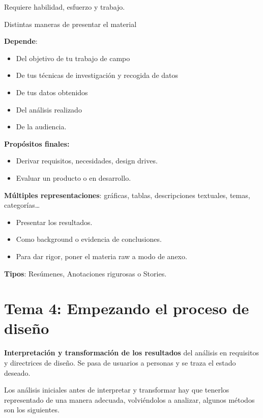 Requiere habilidad, esfuerzo y trabajo.

Distintas maneras de presentar el material

\textbf{Depende}:

\begin{itemize}
\item
  Del objetivo de tu trabajo de campo
\item
  De tus técnicas de investigación y recogida de datos
\item
  De tus datos obtenidos
\item
  Del análisis realizado
\item
  De la audiencia.
\end{itemize}

\textbf{Propósitos finales:}

\begin{itemize}
\item
  Derivar requisitos, necesidades, design drives.
\item
  Evaluar un producto o en desarrollo.
\end{itemize}

\textbf{Múltiples representaciones}: gráficas, tablas, descripciones
textuales, temas, categorías\ldots{}

\begin{itemize}
\item
  Presentar los resultados.
\item
  Como background o evidencia de conclusiones.
\item
  Para dar rigor, poner el materia raw a modo de anexo.
\end{itemize}

\textbf{Tipos}: Resúmenes, Anotaciones rigurosas o Stories.

\hypertarget{tema-4-empezando-el-proceso-de-diseuxf1o}{%
\section{Tema 4: Empezando el proceso de
diseño}\label{tema-4-empezando-el-proceso-de-diseuxf1o}}

\textbf{Interpretación y transformación de los resultados} del análisis
en requisitos y directrices de diseño. Se pasa de usuarios a personas y
se traza el estado deseado.

Los análisis iniciales antes de interpretar y transformar hay que
tenerlos representado de una manera adecuada, volviéndolos a analizar,
algunos métodos son los siguientes.

